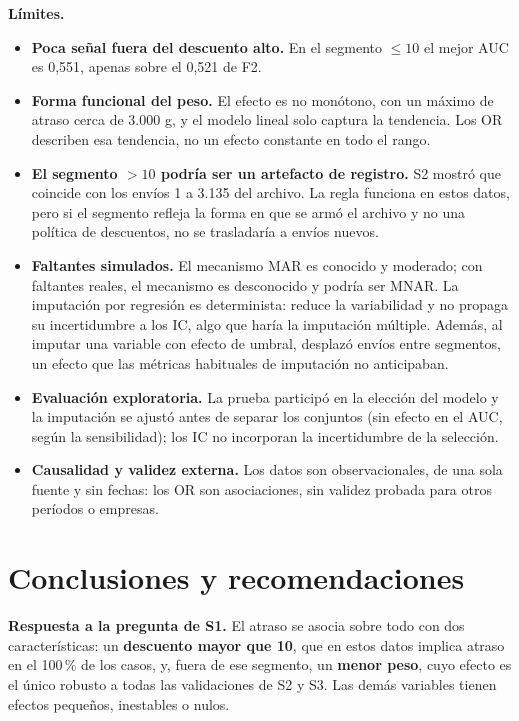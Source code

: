 \documentclass[11pt,a4paper]{article}
\begin{document}
\textbf{Límites.}
\begin{itemize}[leftmargin=*,itemsep=0pt,topsep=1pt]
\item \textbf{Poca señal fuera del descuento alto.} En el segmento $\le 10$ el mejor AUC es 0,551, apenas sobre el 0,521 de F2.
\item \textbf{Forma funcional del peso.} El efecto es no monótono, con un máximo de atraso cerca de 3.000 g, y el modelo lineal solo captura la tendencia. Los OR describen esa tendencia, no un efecto constante en todo el rango.
\item \textbf{El segmento $> 10$ podría ser un artefacto de registro.} S2 mostró que coincide con los envíos 1 a 3.135 del archivo. La regla funciona en estos datos, pero si el segmento refleja la forma en que se armó el archivo y no una política de descuentos, no se trasladaría a envíos nuevos.
\item \textbf{Faltantes simulados.} El mecanismo MAR es conocido y moderado; con faltantes reales, el mecanismo es desconocido y podría ser MNAR. La imputación por regresión es determinista: reduce la variabilidad y no propaga su incertidumbre a los IC, algo que haría la imputación múltiple. Además, al imputar una variable con efecto de umbral, desplazó envíos entre segmentos, un efecto que las métricas habituales de imputación no anticipaban.
\item \textbf{Evaluación exploratoria.} La prueba participó en la elección del modelo y la imputación se ajustó antes de separar los conjuntos (sin efecto en el AUC, según la sensibilidad); los IC no incorporan la incertidumbre de la selección.
\item \textbf{Causalidad y validez externa.} Los datos son observacionales, de una sola fuente y sin fechas: los OR son asociaciones, sin validez probada para otros períodos o empresas.
\end{itemize}

\section{Conclusiones y recomendaciones}\label{sec:conclusiones}
\textbf{Respuesta a la pregunta de S1.} El atraso se asocia sobre todo con dos características: un \textbf{descuento mayor que 10}, que en estos datos implica atraso en el 100\,\% de los casos, y, fuera de ese segmento, un \textbf{menor peso}, cuyo efecto es el único robusto a todas las validaciones de S2 y S3. Las demás variables tienen efectos pequeños, inestables o nulos.
\end{document}
